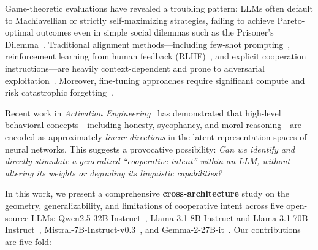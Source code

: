 \documentclass{article}
\begin{document}
Game-theoretic evaluations have revealed a troubling pattern: LLMs often default to Machiavellian or strictly self-maximizing strategies, failing to achieve Pareto-optimal outcomes even in simple social dilemmas such as the Prisoner's Dilemma~\citep{brookman2023playing, fan2024can}. Traditional alignment methods---including few-shot prompting~\citep{wei2022chain}, reinforcement learning from human feedback (RLHF)~\citep{ouyang2022training}, and explicit cooperation instructions---are heavily context-dependent and prone to adversarial exploitation~\citep{perez2022red}. Moreover, fine-tuning approaches require significant compute and risk catastrophic forgetting~\citep{kirkpatrick2017overcoming}.

Recent work in \textit{Activation Engineering}~\citep{turner2023activation, zou2023representation, rimsky2023steering} has demonstrated that high-level behavioral concepts---including honesty, sycophancy, and moral reasoning---are encoded as approximately \textit{linear directions} in the latent representation spaces of neural networks. This suggests a provocative possibility: \textit{Can we identify and directly stimulate a generalized ``cooperative intent'' within an LLM, without altering its weights or degrading its linguistic capabilities?}

In this work, we present a comprehensive \textbf{cross-architecture} study on the geometry, generalizability, and limitations of cooperative intent across five open-source LLMs: Qwen2.5-32B-Instruct~\citep{qwen2025qwen25}, Llama-3.1-8B-Instruct and Llama-3.1-70B-Instruct~\citep{dubey2024llama3}, Mistral-7B-Instruct-v0.3~\citep{jiang2023mistral}, and Gemma-2-27B-it~\citep{team2024gemma2}. Our contributions are five-fold:
\end{document}
